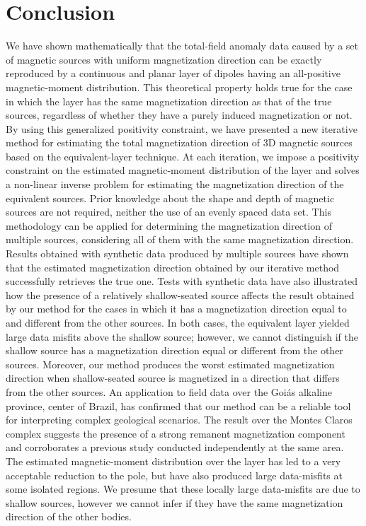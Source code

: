 \section{Conclusion}
\label{sec:conclusion}

We have shown mathematically that the total-field anomaly data caused by a set of magnetic sources
with uniform magnetization direction can be exactly reproduced by a continuous and planar layer of 
dipoles having an all-positive magnetic-moment distribution. 
This theoretical property holds true for the case in which the layer has the same
magnetization direction as that of the true sources, regardless of whether they have 
a purely induced magnetization or not.
By using this generalized positivity constraint, we have presented a new iterative method for 
estimating the total magnetization direction of 3D magnetic sources based on the equivalent-layer technique. 
At each iteration, we impose a positivity constraint on the estimated magnetic-moment distribution of the layer 
and solves a non-linear inverse problem for estimating the magnetization direction of the equivalent sources. 
Prior knowledge about the shape and depth of magnetic sources are not required, neither the use of an evenly spaced 
data set. This methodology can be applied for determining the magnetization direction of multiple sources, 
considering all of them with the same magnetization direction. 
Results obtained with synthetic data produced by multiple sources have shown that the estimated magnetization direction 
obtained by our iterative method successfully retrieves the true one.
Tests with synthetic data have also illustrated how the presence of a relatively shallow-seated source affects the 
result obtained by our method for the cases in which it has a magnetization direction equal to and different from 
the other sources. In both cases, the equivalent layer yielded large data misfits above the shallow source;
however, we cannot distinguish if the shallow source has a magnetization direction equal or different from the other sources. 
Moreover, our method produces the worst estimated magnetization direction when shallow-seated source is magnetized in a 
direction that differs from the other sources.
An application to field data over the Goi{\' a}s alkaline province, center of Brazil, has confirmed that our method can 
be a reliable tool for interpreting complex geological scenarios. The result over the Montes Claros complex suggests the presence 
of a strong remanent magnetization component and corroborates a previous study conducted independently at the same area. 
The estimated magnetic-moment distribution over the layer has led to a very acceptable reduction to the pole, but have also 
produced large data-misfits at some isolated regions. We presume that these locally large data-misfits are due to shallow sources, 
however we cannot infer if they have the same magnetization direction of the other bodies.   
